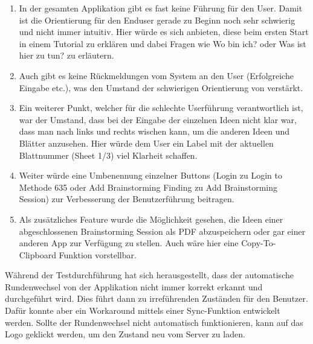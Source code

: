 \begin{enumerate}
	\item In der gesamten Applikation gibt es fast keine Führung für den User. Damit ist die Orientierung für den Enduser gerade zu Beginn noch sehr schwierig und nicht immer intuitiv. Hier würde es sich anbieten, diese beim ersten Start in einem Tutorial zu erklären und dabei Fragen wie \grqq Wo bin ich?\grqq{} oder \grqq Was ist hier zu tun?\grqq{} zu erläutern.
	\item Auch gibt es keine Rückmeldungen vom System an den User (Erfolgreiche Eingabe etc.), was den Umstand der schwierigen Orientierung von verstärkt.
	\item Ein weiterer Punkt, welcher für die schlechte Userführung verantwortlich ist, war der Umstand, dass  bei der Eingabe der einzelnen Ideen nicht klar war, dass man nach links und rechts wischen kann, um die anderen Ideen und Blätter anzusehen. Hier würde dem User ein Label mit der aktuellen Blattnummer (Sheet 1/3) viel Klarheit schaffen.
	\item Weiter würde eine Umbenennung einzelner Buttons (\grqq Login\grqq{} zu \grqq Login to Methode 635\grqq{} oder \grqq Add Brainstorming Finding\grqq{} zu \grqq Add Brainstorming Session\grqq{}) zur Verbesserung der Benutzerführung beitragen.
	\item Als zusätzliches Feature wurde die Möglichkeit gesehen, die Ideen einer abgeschlossenen Brainstorming Session als PDF abzuspeichern oder gar einer anderen App zur Verfügung zu stellen. Auch wäre hier eine \grqq Copy-To-Clipboard\grqq{} Funktion vorstellbar.
\end{enumerate}
Während der Testdurchführung hat sich herausgestellt, dass der automatische Rundenwechsel von der Applikation nicht immer korrekt erkannt und durchgeführt wird. Dies führt dann zu irreführenden Zuständen für den Benutzer. Dafür konnte aber ein Workaround mittels einer Sync-Funktion entwickelt werden. Sollte der Rundenwechsel nicht automatisch funktionieren, kann auf das Logo geklickt werden, um den Zustand neu vom Server zu laden.





